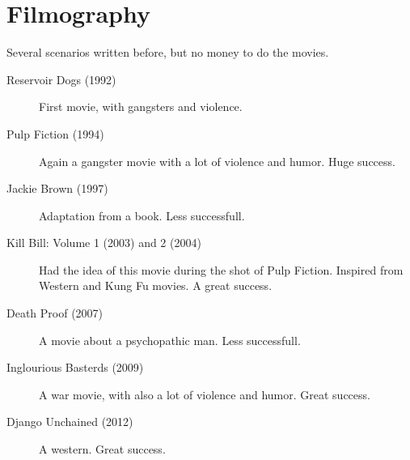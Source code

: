 \documentclass[a4paper,12pt]{article}
\begin{document}
\section{Filmography}

Several scenarios written before, but no money to do the movies.

\begin{description}
    \item[Reservoir Dogs (1992)] First movie, with gangsters and violence.
    \item[Pulp Fiction (1994)] Again a gangster movie with a lot of violence and humor. Huge success.
    \item[Jackie Brown (1997)] Adaptation from a book. Less successfull.
    \item[Kill Bill: Volume 1 (2003) and 2 (2004)] Had the idea of this movie during the shot of Pulp Fiction. Inspired from Western and Kung Fu movies. A great success.
    \item[Death Proof (2007)] A movie about a psychopathic man. Less successfull.
    \item[Inglourious Basterds (2009)] A war movie, with also a lot of violence and humor. Great success.
    \item[Django Unchained (2012)] A western. Great success.
\end{description}
\end{document}
